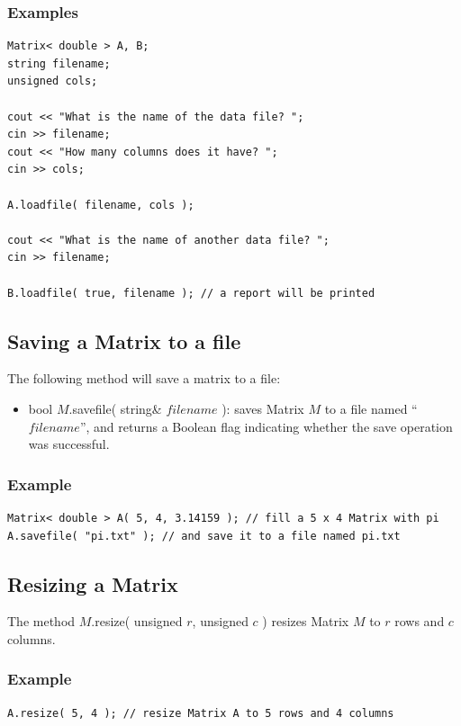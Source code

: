 \documentclass{report}
\begin{document}
\subsubsection{Examples}

\begin{verbatim}
Matrix< double > A, B;
string filename;
unsigned cols;

cout << "What is the name of the data file? ";
cin >> filename;
cout << "How many columns does it have? ";
cin >> cols;

A.loadfile( filename, cols );

cout << "What is the name of another data file? ";
cin >> filename;

B.loadfile( true, filename ); // a report will be printed
\end{verbatim}

\subsection{Saving a Matrix to a file}

The following method will save a matrix to a file:
\begin{itemize}
\item bool $M$.savefile( string\& $filename$ ): saves Matrix $M$ to a
      file named ``$filename$'', and returns a Boolean flag indicating
      whether the save operation was successful.
\end{itemize}

\subsubsection{Example}

\begin{verbatim}
Matrix< double > A( 5, 4, 3.14159 ); // fill a 5 x 4 Matrix with pi
A.savefile( "pi.txt" ); // and save it to a file named pi.txt
\end{verbatim}

\subsection{Resizing a Matrix}

The method $M$.resize( unsigned $r$, unsigned $c$ ) resizes Matrix $M$
to $r$ rows and $c$ columns.

\subsubsection{Example}
\begin{verbatim}
A.resize( 5, 4 ); // resize Matrix A to 5 rows and 4 columns
\end{verbatim}
\end{document}
